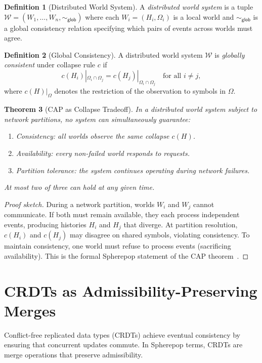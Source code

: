\documentclass[12pt, a4paper, openany]{book}
\theoremstyle{plain}
\newtheorem{theorem}{Theorem}[chapter]
\theoremstyle{definition}
\newtheorem{definition}[theorem]{Definition}
\theoremstyle{remark}
\begin{document}
\begin{definition}[Distributed World System]
A \emph{distributed world system} is a tuple
$\mathcal{W} = (W_1, \ldots, W_n, \sim_{\mathsf{glob}})$
where each $W_i = (H_i, \Omega_i)$ is a local world and
$\sim_{\mathsf{glob}}$ is a global consistency relation specifying which
pairs of events across worlds must agree.
\end{definition}

\begin{definition}[Global Consistency]
A distributed world system $\mathcal{W}$ is \emph{globally consistent} under
collapse rule $c$ if
\[
c(H_i)|_{\Omega_i \cap \Omega_j} = c(H_j)|_{\Omega_i \cap \Omega_j}
\quad \text{for all } i \neq j,
\]
where $c(H)|_\Omega$ denotes the restriction of the observation to symbols in
$\Omega$.
\end{definition}

\begin{theorem}[CAP as Collapse Tradeoff]
In a distributed world system subject to network partitions, no system can
simultaneously guarantee:
\begin{enumerate}
\item \emph{Consistency}: all worlds observe the same collapse $c(H)$.
\item \emph{Availability}: every non-failed world responds to requests.
\item \emph{Partition tolerance}: the system continues operating during network failures.
\end{enumerate}
At most two of three can hold at any given time.
\end{theorem}

\begin{proof}[Proof sketch]
During a network partition, worlds $W_i$ and $W_j$ cannot communicate. If both
must remain available, they each process independent events, producing histories
$H_i$ and $H_j$ that diverge. At partition resolution, $c(H_i)$ and $c(H_j)$
may disagree on shared symbols, violating consistency. To maintain consistency,
one world must refuse to process events (sacrificing availability).
This is the formal Spherepop statement of the CAP theorem~\cite{shapiro11}.
\end{proof}

\section{CRDTs as Admissibility-Preserving Merges}

Conflict-free replicated data types (CRDTs) achieve eventual consistency by
ensuring that concurrent updates commute. In Spherepop terms, CRDTs are merge
operations that preserve admissibility.
\end{document}
